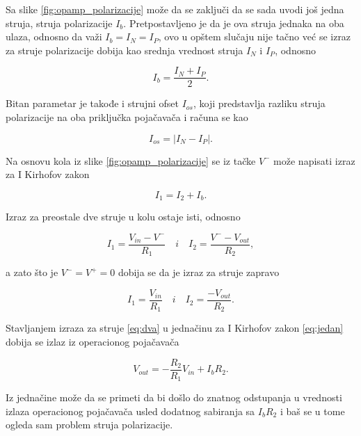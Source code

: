 {Sa slike \ref{fig:opamp_polarizacije} može da se zaključi da se sada uvodi još jedna struja, struja polarizacije $I_b$. Pretpostavljeno je da je ova struja jednaka na oba ulaza, odnosno da važi $I_b = I_{N} = I_{P}$, ovo u opštem slučaju nije tačno već se izraz za struje polarizacije dobija kao srednja vrednost struja $I_N$ i $I_P$, odnosno}

\begin{equation}
    I_b = \frac{I_N + I_P}{2}.
\end{equation}

{Bitan parametar je takođe i strujni ofset $I_{os}$, koji predstavlja razliku struja polarizacije na oba priključka pojačavača i računa se kao}

\begin{equation}
    I_{os} = |I_N - I_P|.
\end{equation}

{Na osnovu kola iz slike \ref{fig:opamp_polarizacije} se iz tačke $V^-$ može napisati izraz za I Kirhofov zakon}

\begin{equation}
    I_1 = I_2 + I_b.
    \label{eq:jedan}
\end{equation}

{Izraz za preostale dve struje u kolu ostaje isti, odnosno}

\begin{equation}
    I_1 = \frac{V_{in} - V^-}{R_1} \quad i \quad I_2 = \frac{V^- - V_{out}}{R_2},
\end{equation}

{a zato što je $V^- = V^+ = 0$ dobija se da je izraz za struje zapravo}

\begin{equation}
    I_1 = \frac{V_{in}}{R_1} \quad i \quad I_2 = \frac{- V_{out}}{R_2}.
    \label{eq:dva}
\end{equation}

{Stavljanjem izraza za struje \ref{eq:dva} u jednačinu za I Kirhofov zakon \ref{eq:jedan} dobija se izlaz iz operacionog pojačavača}

\begin{equation}
    \boxed{V_{out} = -\frac{R_2}{R_1}V_{in} + I_bR_2}.
\end{equation}

{Iz jednačine može da se primeti da bi došlo do znatnog odstupanja u vrednosti izlaza operacionog pojačavača usled dodatnog sabiranja sa $I_bR_2$ i baš se u tome ogleda sam problem struja polarizacije.}

